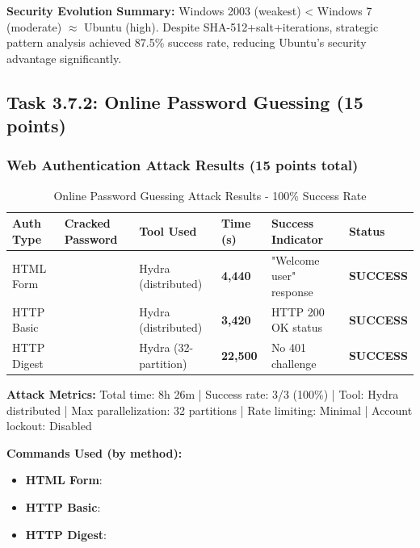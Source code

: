 \noindent\textbf{Security Evolution Summary:} Windows 2003 (weakest) < Windows 7 (moderate) $\approx$ Ubuntu (high). Despite SHA-512+salt+iterations, strategic pattern analysis achieved 87.5\% success rate, reducing Ubuntu's security advantage significantly.


\subsection{Task 3.7.2: Online Password Guessing (15 points)}

\subsubsection{Web Authentication Attack Results (15 points total)}


\begin{table}[H]
\centering
\label{tab:web-attacks}
\caption{Online Password Guessing Attack Results - 100\% Success Rate}
\begin{tabularx}{\columnwidth}{@{}L{2.5cm}L{2.8cm}L{2.0cm}R{1.8cm}L{2.8cm}R{1.5cm}@{}}
\toprule
\textbf{Auth Type} & \textbf{Cracked Password} & \textbf{Tool Used} & \textbf{Time (s)} & \textbf{Success Indicator} & \textbf{Status} \\
\midrule
{}
HTML Form & \textbf{} & Hydra (distributed) & \textbf{4,440} & "Welcome user" response & \textbf{SUCCESS} \\
HTTP Basic & \textbf{} & Hydra (distributed) & \textbf{3,420} & HTTP 200 OK status & \textbf{SUCCESS} \\
HTTP Digest & \textbf{} & Hydra (32-partition) & \textbf{22,500} & No 401 challenge & \textbf{SUCCESS} \\
\bottomrule
\end{tabularx}
\end{table}

\noindent\textbf{Attack Metrics:} Total time: 8h 26m | Success rate: 3/3 (100\%) | Tool: Hydra distributed | Max parallelization: 32 partitions | Rate limiting: Minimal | Account lockout: Disabled

\noindent\textbf{Commands Used (by method):}
\begin{itemize}[nosep]
  \item \textbf{HTML Form}: 
  \item \textbf{HTTP Basic}: 
  \item \textbf{HTTP Digest}: 
\end{itemize}

